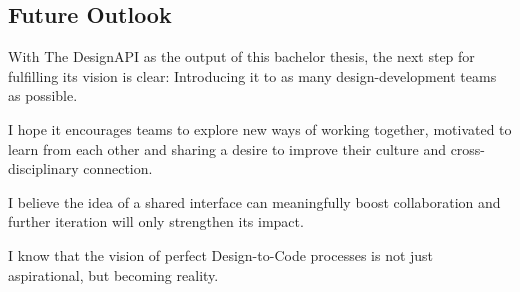 \newpage
\subsection{Future Outlook}
With The DesignAPI as the output of this bachelor thesis, the next step for fulfilling its vision is
clear: Introducing it to as many design-development teams as possible. 

I hope it encourages teams to explore new ways of working together, motivated to learn from each
other and sharing a desire to improve their culture and cross-disciplinary connection.

I believe the idea of a shared interface can meaningfully boost collaboration and further
iteration will only strengthen its impact.

I know that the vision of perfect Design-to-Code processes is not just aspirational, but becoming
reality.

